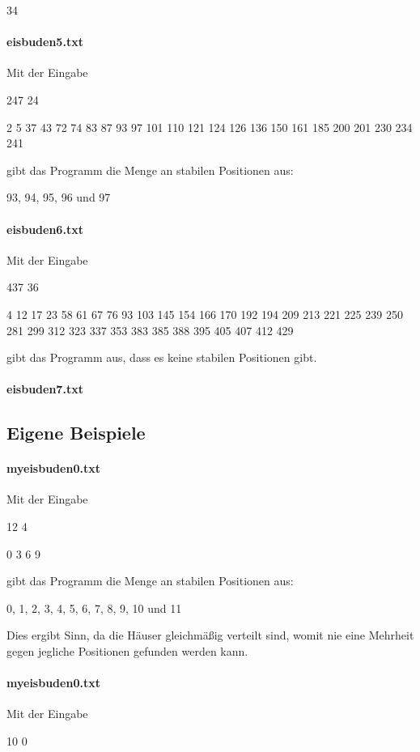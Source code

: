 \documentclass[a4paper,10pt,ngerman]{scrartcl}
\begin{document}
34

\paragraph{eisbuden5.txt}
Mit der Eingabe

247 24

2 5 37 43 72 74 83 87 93 97 101 110 121 124 126 136 150 161 185 200 201 230 234 241

gibt das Programm die Menge an stabilen Positionen aus:

93, 94, 95, 96 und 97

\paragraph{eisbuden6.txt}
Mit der Eingabe

437 36

4 12 17 23 58 61 67 76 93 103 145 154 166 170 192 194 209 213 221 225 239 250 281 299 312 323 337 353 383 385 388 395 405 407 412 429

gibt das Programm aus, dass es keine stabilen Positionen gibt.

\paragraph{eisbuden7.txt}

\subsection{Eigene Beispiele}

\paragraph{myeisbuden0.txt}
Mit der Eingabe

12 4

0 3 6 9

gibt das Programm die Menge an stabilen Positionen aus:

0, 1, 2, 3, 4, 5, 6, 7, 8, 9, 10 und 11

Dies ergibt Sinn, da die Häuser gleichmäßig verteilt sind, womit nie eine Mehrheit gegen jegliche Positionen gefunden werden kann.

\paragraph{myeisbuden0.txt}
Mit der Eingabe

10 0
\end{document}
